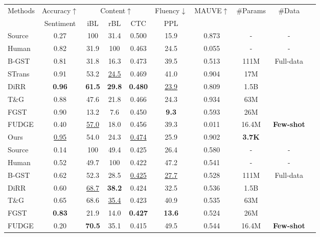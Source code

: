 \documentclass[11pt]{article}
\begin{document}
\begin{table}[ht]
    \centering
    \small
    \begin{tabular}{@{}lccccccccc@{}}
        \toprule
\multirow{2}{*}{Methods}&Accuracy$\uparrow$&\multicolumn{3}{c}{Content$\uparrow$} &Fluency$\downarrow$&\multirow{2}{*}{MAUVE$\uparrow$} & \multirow{2}{*}{\#Params}& \multirow{2}{*}{\#Data}\\\cmidrule(r){2-2}\cmidrule(r){3-5}\cmidrule(r){6-6}
        & Sentiment& iBL& rBL& CTC&  PPL& & \\ \midrule
        Source& 0.27& 100& 31.4& 0.500&15.9& 0.873&-&-
        \\
        Human& 0.82& 31.9& 100& 0.463&24.5& 0.055&-&-
        \\ \midrule
B-GST& 0.81& 31.8& 16.3& 0.473&39.5&  0.513&111M & \multirow{5}{*}{Full-data}
        \\
        STrans  & 0.91& 53.2& \underline{24.5} & 0.469&41.0&  0.904&17M&
        \\
        DiRR& \textbf{0.96}&\textbf{61.5}& \textbf{29.8}& \textbf{0.480}&\underline{23.9}&0.809&1.5B &
        \\
        T\&G & 0.88 & 47.6 &21.8 & 0.466& 24.3 &0.934 &63M&
        \\
        FGST & 0.90 & 13.2 &7.6 & 0.450& \textbf{9.3}&0.593 & 26M&
        \\ \midrule
FUDGE& 0.40 & \underline{57.0} & 18.0 & 0.456 & 39.3&0.011&16.4M &\multirow{2}{*}{\textbf{Few-shot}}
        \\
        Ours& \underline{0.95} & {54.0} &  24.3& \underline{0.474}& 25.9 &0.902&\textbf{3.7K}&
        \\\midrule\midrule
Source& 0.14& 100& 49.4& 0.425& 26.4& 0.580  &-&-
        \\
        Human& 0.52& 49.7& 100&0.422& 47.2&  0.541 &-&-
        \\ \midrule
B-GST& 0.62& 52.3& 28.5& \underline{0.425}& \underline{27.7}& 0.528& 111M &\multirow{4}{*}{Full-data}
        \\
        DiRR& 0.60&\underline{68.7}& \textbf{38.2}& 0.424&32.5 &0.536 &1.5B&
        \\
        T\&G & 0.65 & {68.6} &\underline{35.4} & 0.423& 40.9& 0.535 &63M&
        \\
        FGST & \textbf{0.83} & 21.9 &14.0 & \textbf{0.427}& \textbf{13.6}& 0.524 &26M&
        \\ \midrule
        FUDGE& 0.20&\textbf{70.5}&35.1&0.415&49.5&0.544 &16.4M&\multirow{2}{*}{\textbf{Few-shot}}

\end{tabular}
\end{table}
\end{document}
